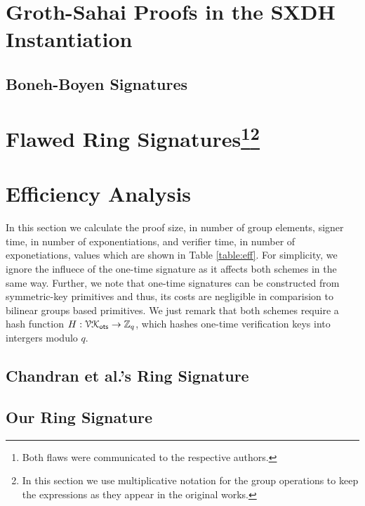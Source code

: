 \documentclass[a4paper,english]{lipics-v2016}
\begin{document}
		

	\section{Groth-Sahai Proofs in the SXDH Instantiation} \label{sec:gs-proofs}

		

	\subsection{Boneh-Boyen Signatures} \label{sec:bbs}
    
            

	 \section{Flawed Ring Signatures\protect\footnote{Both flaws were communicated to the respective authors.}\protect\footnote{In this section we use multiplicative notation for the group operations to keep the expressions as they appear in the original works.}}\label{sec:rs-flawed}
    
        	 

	\section{Efficiency Analysis}
		In this section we calculate the proof size, in number of group elements, signer time, in number of exponentiations, and verifier time, in number of exponetiations, values which are shown in Table \ref{table:eff}. For simplicity, we ignore the influece of the one-time signature as it affects both schemes in the same way. Further, we note that one-time signatures can be constructed from symmetric-key primitives and thus, its costs are negligible in comparision to bilinear groups based primitives. We just remark that both schemes require a hash function $H:\mathcal{VK}_{\mathsf{ots}}\to\mathbb{Z}_q$, which hashes one-time verification keys into intergers modulo $q$.
		\subsection{Chandran et al.'s Ring Signature}
			
		\subsection{Our Ring Signature}
			
\end{document}

